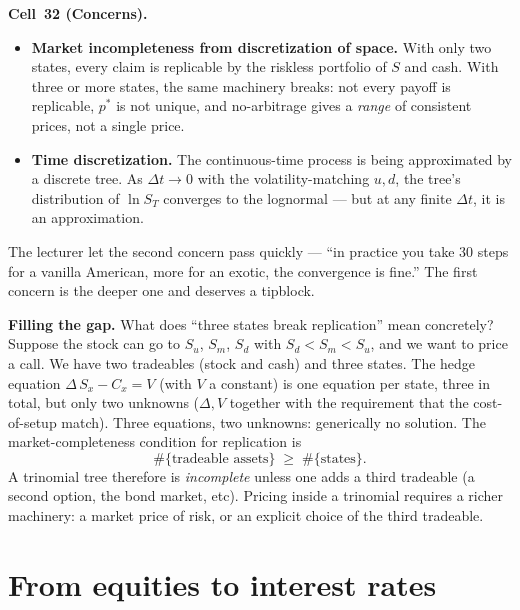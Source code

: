 \begin{keyblock}
\textbf{Cell~32 (Concerns).}
\begin{itemize}
  \item \textbf{Market incompleteness from discretization of space.}
        With only two states, every claim is replicable by the
        riskless portfolio of $S$ and cash. With three or more
        states, the same machinery breaks: not every payoff is
        replicable, $p^*$ is not unique, and no-arbitrage gives a
        \emph{range} of consistent prices, not a single price.
  \item \textbf{Time discretization.} The continuous-time process
        is being approximated by a discrete tree. As $\Delta t \to 0$
        with the volatility-matching $u, d$, the tree's distribution
        of $\ln S_T$ converges to the lognormal --- but at any
        finite $\Delta t$, it is an approximation.
\end{itemize}
\end{keyblock}

The lecturer let the second concern pass quickly --- ``in practice
you take 30 steps for a vanilla American, more for an exotic, the
convergence is fine.'' The first concern is the deeper one and
deserves a tipblock.

\begin{tipblock}
\textbf{Filling the gap.} What does ``three states break replication''
mean concretely? Suppose the stock can go to $S_u$, $S_m$, $S_d$
with $S_d < S_m < S_u$, and we want to price a call. We have two
tradeables (stock and cash) and three states. The hedge equation
$\Delta\,S_x - C_x = V$ (with $V$ a constant) is one equation per
state, three in total, but only two unknowns ($\Delta, V$ together
with the requirement that the cost-of-setup match). Three equations,
two unknowns: generically no solution. The market-completeness
condition for replication is
\[
  \#\{\text{tradeable assets}\} \;\ge\; \#\{\text{states}\}.
\]
A trinomial tree therefore is \emph{incomplete} unless one adds a
third tradeable (a second option, the bond market, etc). Pricing
inside a trinomial requires a richer machinery: a market price of
risk, or an explicit choice of the third tradeable.
\end{tipblock}

\section{From equities to interest rates}\label{L8-sec:rateequities}

